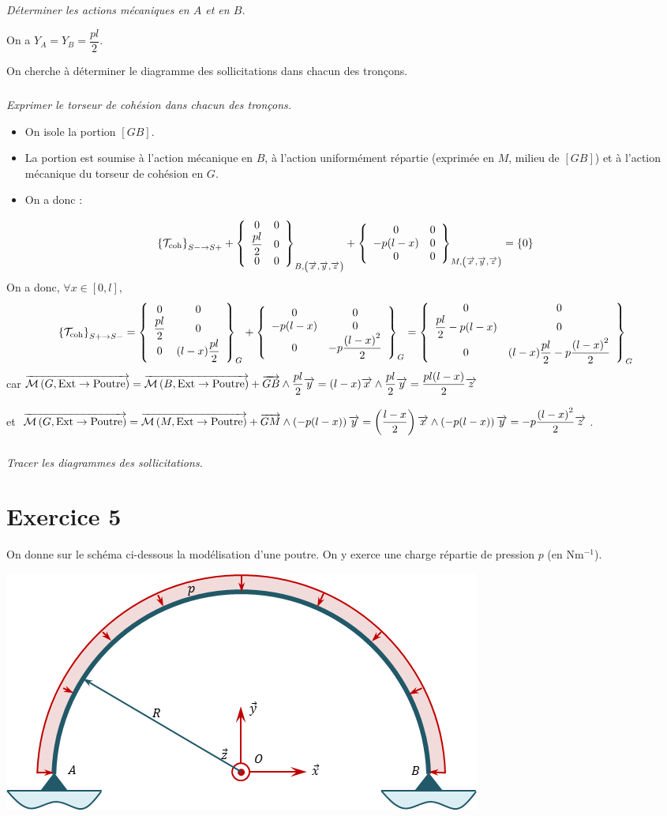 \documentclass[10pt,fleqn]{article} %
\begin{document}
\begin{multicols}{2}
\subparagraph{}
\textit{Déterminer les actions mécaniques en $A$ et en $B$.}
\ifprof
\begin{corrige}
On a $Y_A = Y_B = \dfrac{pl}{2}$.
\end{corrige}
\else 
\fi


On cherche à déterminer le diagramme des sollicitations dans chacun des tronçons.

\subparagraph{}
\textit{Exprimer le torseur de cohésion dans chacun des tronçons.}
\ifprof
\begin{corrige}
\begin{itemize}
\item On isole la portion $[GB]$.
\item La portion est soumise à l'action mécanique en $B$, à l'action uniformément répartie (exprimée en $M$, milieu de $[GB]$) et à l'action mécanique du torseur de cohésion en $G$.
\item On a donc : 
\end{itemize}
$$
\torseurscoh_{S-\rightarrow S+} +
 \torseurcol{0}{\dfrac{pl}{2}}{0}{0}{0}{0}{B,\left( \vect{x},\vect{y},\vect{z} \right)} 
 +\torseurcol{0}{-p(l-x)}{0}{0}{0}{0}{M,\left( \vect{x},\vect{y},\vect{z} \right)} 
 = \{0\}
$$
On a donc, $\forall x \in \left[0,l\right]$, 
$$
\torseurscoh_{S+\rightarrow S-}
= \torseurcol{0}{\dfrac{pl}{2}}{0}{0}{0}{(l-x)\dfrac{pl}{2}}{G} 
 +\torseurcol{0}{-p(l-x)}{0}{0}{0}{-p\dfrac{\left(l-x\right)^2}{2}}{G} 
 = \torseurcol{0}{\dfrac{pl}{2}-p(l-x)}{0}{0}{0}{(l-x)\dfrac{pl}{2}-p\dfrac{\left(l-x\right)^2}{2}}{G} 
$$
car 
$\vectm{G}{\text{Ext}}{\text{Poutre}}
=\vectm{B}{\text{Ext}}{\text{Poutre}} + \vect{GB}\wedge \dfrac{pl}{2} \vect{y}  
=  (l-x)\vect{x}  \wedge \dfrac{pl}{2} \vect{y}
=  \dfrac{pl(l-x)}{2} \vect{z}
$ 

et 
$\vectm{G}{\text{Ext}}{\text{Poutre}}
=  \vectm{M}{\text{Ext}}{\text{Poutre}} + \vect{GM}\wedge \left( -p(l-x) \right) \vect{y}  
= \left(\dfrac{l-x}{2}\right)\vect{x}\wedge \left(-p(l-x)\right) \vect{y}  
=  -p\dfrac{\left(l-x\right)^2}{2}\vect{z}  
$.
\end{corrige}
\else 
\fi

\subparagraph{}
\textit{Tracer les diagrammes des sollicitations.}
\ifprof
\begin{corrige}
\end{corrige}
\else 
\fi


\section*{Exercice 5}
\setcounter{subparagraph}{0}
On donne sur le schéma ci-dessous la modélisation d'une poutre. On y exerce une charge répartie de pression $p$ (en $\text{N}\text{m}^{-1}$).
\begin{center}
\includegraphics[width=.45\textwidth]{images/exo_06}
\end{center}


\end{multicols}
\end{document}
